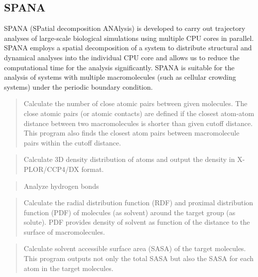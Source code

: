 \documentclass[a4paper,11pt,oneside,english]{sphinxmanual}
\begin{document}
\subsection{SPANA}
\label{\detokenize{02_Available_Programs:spana}}
SPANA (SPatial decomposition ANAlysis) is developed to carry out trajectory analyses of large-scale biological simulations using multiple CPU cores in parallel. SPANA employs a spatial decomposition of a system to distribute structural and dynamical analyses into the individual CPU core and allows us to reduce the computational time for the analysis significantly. SPANA is suitable for the analysis of systems with multiple macromolecules (such as cellular crowding systems) under the periodic boundary condition.

\begin{quote}

Calculate the number of close atomic pairs between given molecules. The close atomic pairs (or atomic contacts) are defined if the closest atom-atom distance between two macromolecules is shorter than given cutoff distance. This program also finds the closest atom pairs between macromolecule pairs within the cutoff distance.
\end{quote}

\begin{quote}

Calculate 3D density distribution of atoms and output the density in X-PLOR/CCP4/DX format.
\end{quote}

\begin{quote}

Analyze hydrogen bonds
\end{quote}

\begin{quote}

Calculate the radial distribution function (RDF) and proximal distribution function (PDF) of molecules (as solvent) around the target group (as solute). PDF provides density of solvent as function of the distance to the surface of macromolecules.
\end{quote}

\begin{quote}

Calculate solvent accessible surface area (SASA) of the target molecules. This program outputs not only the total SASA but also the SASA for each atom in the target molecules.
\end{quote}
\end{document}
